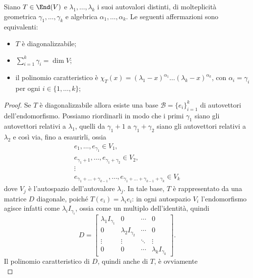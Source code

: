 \begin{teorema} \label{t:diagonalizzabilita}
	Siano $T\in\End(V)$ e $\lambda_1,\dots,\lambda_k$ i suoi autovalori distinti, di molteplicità geometrica $\gamma_1,\dots,\gamma_k$ e algebrica $\alpha_1,\dots,\alpha_k$.
	Le seguenti affermazioni sono equivalenti:
	\begin{itemize}
		\item $T$ è diagonalizzabile;
		\item $\sum_{i=1}^k\gamma_i=\dim V$;
		\item il polinomio caratteristico è $\chi_T(x)=(\lambda_1-x)^{\alpha_1}\dots(\lambda_k-x)^{\alpha_k}$, con $\alpha_i=\gamma_i$ per ogni $i\in\{1,\dots,k\}$;
	\end{itemize}
\end{teorema}
\begin{proof}
 	Se $T$ è diagonalizzabile allora esiste una base $\mathcal B=\{e_i\}_{i=1}^k$ di autovettori dell'endomorfismo.
	Possiamo riordinarli in modo che i primi $\gamma_1$ siano gli autovettori relativi a $\lambda_1$, quelli da $\gamma_1+1$ a $\gamma_1+\gamma_2$ siano gli autovettori relativi a $\lambda_2$ e cos\`i via, fino a esaurirli, ossia
	\begin{gather*}
		e_1,\dots,e_{\gamma_1}\in V_1,\\
		e_{\gamma_1 + 1},\dots,e_{\gamma_1 + \gamma_2}\in V_2,\\
		\vdots\\
		e_{\gamma_1 + \dots + \gamma_{k-1}},\dots,e_{\gamma_1 + \dots + \gamma_{k-1} + \gamma_k}\in V_k
	\end{gather*}
	dove $V_j$ è l'autospazio dell'autovalore $\lambda_j$.
In tale base, $T$ è rappresentato da una matrice $D$ diagonale, poich\'e $T(e_i)=\lambda_ie_i$: in ogni autospazio $V_i$ l'endomorfismo agisce infatti come $\lambda_i I_{\gamma_i}$, ossia come un multiplo dell'identità, quindi
	\begin{equation}
		D=
		\begin{bmatrix}
			\lambda_1 I_{\gamma_1}	& 0							& \cdots	& 0\\
			0						& \lambda_2 I_{\gamma_2}	& \cdots	& 0 \\
			\vdots					& \vdots					& \ddots	& \vdots \\
			0						& 0							& \cdots	& \lambda_k I_{\gamma_k}
		\end{bmatrix}.
	\end{equation}
	Il polinomio caratteristico di $D$, quindi anche di $T$, è ovviamente
	\begin{equation}

\end{equation}
\end{proof}
